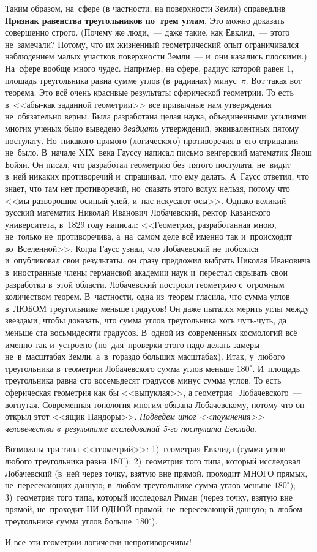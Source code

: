 Таким образом, на~сфере (в частности, на поверхности Земли) справедлив \textbf{Признак равенства треугольников по~трем углам}.
Это можно доказать совершенно строго. (Почему же люди,~--- даже такие, как
Евклид,~--- этого не~замечали? Потому, что их жизненный геометрический опыт ограничивался
наблюдением малых участков поверхности Земли~--- и~они казались плоскими.) На~сфере вообще много
чудес. Например, на сфере, радиус которой равен 1, площадь треугольника равна сумме углов (в~радианах) минус~$\pi$. Вот такая
вот теорема. Это всё очень красивые результаты сферической геометрии. То есть в~<<абы-как заданной
геометрии>> все привычные нам утверждения не~обязательно верны. Была разработана целая наука,
объединенными усилиями многих ученых было выведено \textit{двадцать} утверждений, эквивалентных пятому
постулату. Но~никакого прямого (логического) противоречия в~его отрицании не~было. В~начале
XIX~века Гауссу написал письмо венгерский математик Янош Бойяи. Он писал, что разработал
геометрию без~пятого постулата, не~видит в~ней никаких противоречий и~спрашивал, что ему делать.
А~Гаусс ответил, что знает, что там нет противоречий, но~сказать этого вслух нельзя, потому что <<мы
разворошим осиный улей, и~нас искусают осы>>. Однако великий русский математик Николай Иванович
Лобачевский, ректор Казанского университета, в~1829 году написал: <<Геометрия, разработанная мною,
не~только не~противоречива, а~на~самом деле всё именно так и~происходит во~Вселенной>>.
 Когда Гаусс
узнал, что Лобачевский не~побоялся и~опубликовал свои результаты, он сразу предложил выбрать
Николая Ивановича в~иностранные члены германской академии наук и~перестал скрывать свои разработки
в~этой области. Лобачевский построил геометрию с~огромным количеством теорем. В~частности, одна
из~теорем гласила, что сумма углов в~ЛЮБОМ треугольнике меньше  градусов! Он даже пытался
мерить углы между звездами, чтобы доказать, что сумма углов треугольника хоть чуть-чуть, да
меньше ста восьмидесяти градусов. В~одной из~современных космологий всё именно так и~устроено
(но~для~проверки этого надо делать замеры не~в~масштабах Земли, а~в~гораздо больших масштабах).
Итак, у~любого треугольника в~геометрии Лобачевского сумма углов меньше $180^{\circ}$. И~площадь
треугольника равна сто восемьдесят градусов минус сумма углов. То есть сферическая геометрия как
бы <<выпуклая>>, а геометрия ~Лобачевского~--- вогнутая.
 Современная топология многим обязана Лобачевскому, потому
что он открыл этот <<ящик Пандоры>>.
\textit{Подведем итог <<поумнения>> человечества в~результате исследований 5-го постулата Евклида.}

\pagebreak

Возможны три типа <<геометрий>>: 1)~геометрия Евклида (сумма углов любого треугольника равна $180^{\circ}$);
2)~геометрия того типа, который исследовал Лобачевский (в~ней через точку, взятую вне прямой,
проходит МНОГО прямых, не~пересекающих данную; в~любом треугольнике сумма углов меньше $180^{\circ})$;
3)~геометрия того типа, который исследовал Риман (через точку, взятую вне прямой, не~проходит НИ ОДНОЙ
прямой, не~пересекающей данную; в~любом треугольнике сумма углов больше~$180^{\circ}$).

И все эти геометрии логически непротиворечивы!
\endinput
